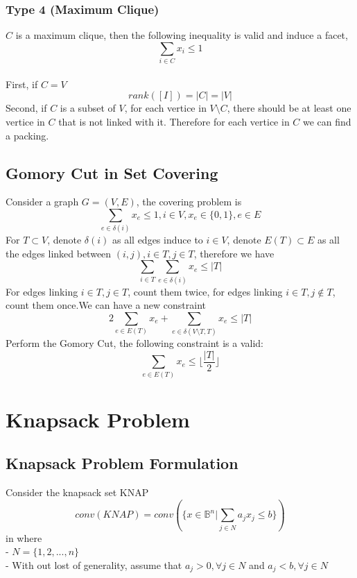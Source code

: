 				\subsection{Type 4 (Maximum Clique)}
					$C$ is a maximum clique, then the following inequality is valid and induce a facet,
					\begin{equation}
						\sum_{i\in C} x_i \le 1 
					\end{equation}
					\\
						First, if $C=V$
						\begin{equation}
							rank\left(\left[I\right]\right) = |C| = |V| 
						\end{equation}
						Second, if $C$ is a subset of $V$, for each vertice in $V \setminus C$, there should be at least one vertice in $C$ that is not linked with it. Therefore for each vertice in $C$ we can find a packing.

			\section{Gomory Cut in Set Covering}
				Consider a graph $G=(V, E)$, the covering problem is
				\begin{equation}
					\sum_{e\in \delta(i)}x_e \le 1, i\in V, x_e\in \{0, 1\}, e\in E
				\end{equation}
				For $T\subset V$, denote $\delta(i)$ as all edges induce to $i\in V$, denote $E(T) \subset E$ as all the edges linked between $(i, j), i\in T, j\in T$, therefore we have
				\begin{equation}
					\sum_{i\in T}\sum_{e\in \delta(i)}x_e \le |T| 
				\end{equation}
				For edges linking $i \in T, j \in T$, count them twice, for edges linking $i\in T, j\notin T$, count them once.We can have a new constraint
				\begin{equation}
					2\sum_{e\in E(T)}x_e + \sum_{e\in \delta(V\setminus T, T)}x_e \le |T| 
				\end{equation}
				Perform the Gomory Cut, the following constraint is a valid:
				\begin{equation}
					\sum_{e\in E(T)}x_e \le \lfloor \frac{|T|}2 \rfloor 
				\end{equation}

		\chapter{Knapsack Problem}
			\section{Knapsack Problem Formulation}
				Consider the knapsack set KNAP
				\begin{equation}conv(KNAP)= conv(\{x\in \mathbb{B}^n|\sum_{j\in N}a_jx_j\le b\})\end{equation}
				in where\\
				- $N = \{1, 2, ..., n\}$\\
				- With out lost of generality, assume that $a_j > 0, \forall j \in N$ and $a_j < b, \forall j \in N$

